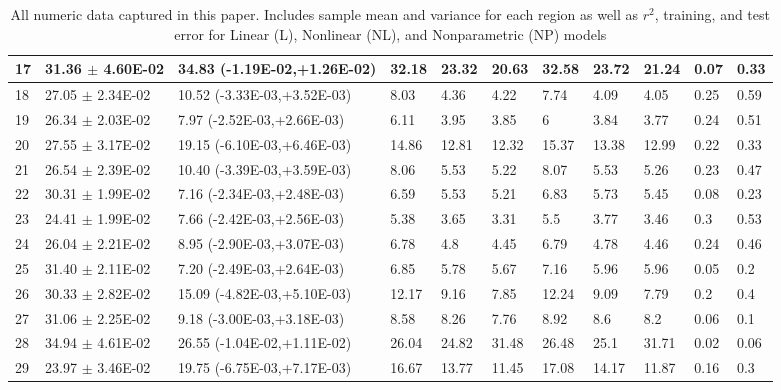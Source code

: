 \documentclass[12pt]{article}
\begin{document}
\begin{landscape}
\begin{table}
\begin{tabular}{|l|l|l|l|l|l|l|l|l|l|l|}
17&31.36 $\pm$ 4.60E-02& 34.83 (-1.19E-02,+1.26E-02)&32.18&23.32&20.63&32.58&23.72&21.24&0.07&0.33\\\hline
18&27.05 $\pm$ 2.34E-02& 10.52 (-3.33E-03,+3.52E-03)&8.03&4.36&4.22&7.74&4.09&4.05&0.25&0.59\\\hline
19&26.34 $\pm$ 2.03E-02& 7.97 (-2.52E-03,+2.66E-03)&6.11&3.95&3.85&6&3.84&3.77&0.24&0.51\\\hline
20&27.55 $\pm$ 3.17E-02& 19.15 (-6.10E-03,+6.46E-03)&14.86&12.81&12.32&15.37&13.38&12.99&0.22&0.33\\\hline
21&26.54 $\pm$ 2.39E-02& 10.40 (-3.39E-03,+3.59E-03)&8.06&5.53&5.22&8.07&5.53&5.26&0.23&0.47\\\hline
22&30.31 $\pm$ 1.99E-02& 7.16 (-2.34E-03,+2.48E-03)&6.59&5.53&5.21&6.83&5.73&5.45&0.08&0.23\\\hline
23&24.41 $\pm$ 1.99E-02& 7.66 (-2.42E-03,+2.56E-03)&5.38&3.65&3.31&5.5&3.77&3.46&0.3&0.53\\\hline
24&26.04 $\pm$ 2.21E-02& 8.95 (-2.90E-03,+3.07E-03)&6.78&4.8&4.45&6.79&4.78&4.46&0.24&0.46\\\hline
25&31.40 $\pm$ 2.11E-02& 7.20 (-2.49E-03,+2.64E-03)&6.85&5.78&5.67&7.16&5.96&5.96&0.05&0.2\\\hline
26&30.33 $\pm$ 2.82E-02& 15.09 (-4.82E-03,+5.10E-03)&12.17&9.16&7.85&12.24&9.09&7.79&0.2&0.4\\\hline
27&31.06 $\pm$ 2.25E-02& 9.18 (-3.00E-03,+3.18E-03)&8.58&8.26&7.76&8.92&8.6&8.2&0.06&0.1\\\hline
28&34.94 $\pm$ 4.61E-02& 26.55 (-1.04E-02,+1.11E-02)&26.04&24.82&31.48&26.48&25.1&31.71&0.02&0.06\\\hline
29&23.97 $\pm$ 3.46E-02& 19.75 (-6.75E-03,+7.17E-03)&16.67&13.77&11.45&17.08&14.17&11.87&0.16&0.3\\\hline
\end{tabular}
\caption{All numeric data captured in this paper. Includes sample mean and variance for each region as well as $r^2$, training, and test error for Linear (L), Nonlinear (NL), and Nonparametric (NP) models}
\label{resultstable}
\end{table}
\end{landscape}
\end{document}

